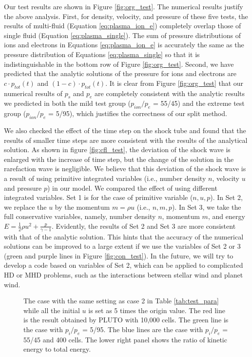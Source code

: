 \documentclass[journal, onecolumn]{aastex631}
\begin{document}
\begin{CJK*}{UTF8}{gbsn}
\begin{appendix}
Our test results are shown in Figure \ref{fig:org_test}. The numerical results justify the above analysis. First, for density, velocity, and pressure of these five tests, the results of multi-fluid (Equation \ref{eq:plasma_ion_e}) completely overlap those of single fluid (Equation \ref{eq:plasma_single}). The sum of pressure distributions of ions and electrons in Equations \ref{eq:plasma_ion_e} is accurately the same as the pressure distribution of Equations \ref{eq:plasma_single} so that it is indistinguishable in the bottom row of Figure \ref{fig:org_test}. Second, we have predicted that the analytic solutions of the pressure for ions and electrons are $c\cdot p_{tot}(t)$ and $(1-c)\cdot p_{tot}(t)$. It is clear from Figure \ref{fig:org_test} that our numerical results of $p_{s}$ and $p_{e}$ are completely consistent with the analytic results we predicted in both the mild test group ($p_{ion}/p_e$ = 55/45) and the extreme test group ($p_{ion}/p_e$ = 5/95), which justifies the correctness of our split method.

We also checked the effect of the time step on the shock tube and found that the results of smaller time steps are more consistent with the results of the analytical solution. As shown in figure \ref{fig:cfl_test}, the deviation of the shock wave is enlarged with the increase of time step, but the change of the solution in the rarefaction wave is negligible. We believe that this deviation of the shock wave is a result of using primitive integrated variables (i.e., number density $n$, velocity $u$ and pressure $p$) in our model. We compared the effect of using different integrated variables. Set 1 is for the case of primitive variable ($n, u, p$). In Set 2, we replace the $u$ by the momentum $m=\rho u$ (i.e., $n, m, p$). In Set 3, we take the full conservative variables, namely, number density $n$, momentum $m$, and energy $E=\frac{1}{2}\rho u^2 + \frac{p}{\gamma -1}$. Evidently, the results of Set 2 and Set 3 are more consistent with that of the analytic solution. This hints that the accuracy of the numerical solutions can be improved to a large extent if we use the variables of Set 2 or 3 (green and purple lines in Figure \ref{fig:con_test}). In the future, we will try to develop a code based on variables of Set 2, which can be applied to complicated HD or MHD problems, such as the interactions between stellar wind and planet wind.

\begin{figure}[ht!]
\caption{The case with the same setting as case 2 in Table \ref{tab:test_para} while all the initial $u$ is set as 5 times the origin value. The red line is the result obtained by PLUTO with 10,000 cells. The green line is the case with $p_i/p_e$ = 5/95. The blue lines are the case with $p_i/p_e$ = 55/45 and 400 cells. The lower right panel shows the ratio of kinetic energy to total energy.}
\label{fig:ek_aly}
\end{figure}



\end{appendix}
\end{CJK*}
\end{document}
